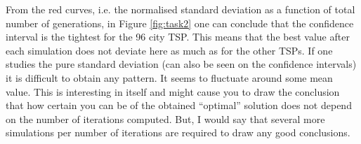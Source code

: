 \documentclass[]{article}
\begin{document}
From the red curves, i.e. the normalised standard deviation as a function of total number of generations, in Figure \ref{fig:task2} one can conclude that the confidence interval is the tightest for the 96 city TSP.
This means that the best value after each simulation does not deviate here as much as for the other TSPs.
If one studies the pure standard deviation (can also be seen on the confidence intervals) it is difficult to obtain any pattern.
It seems to fluctuate around some mean value.
This is interesting in itself and might cause you to draw the conclusion that how certain you can be of the obtained ``optimal'' solution does not depend on the number of iterations computed.
But, I would say that several more simulations per number of iterations are required to draw any good conclusions.
\end{document}
